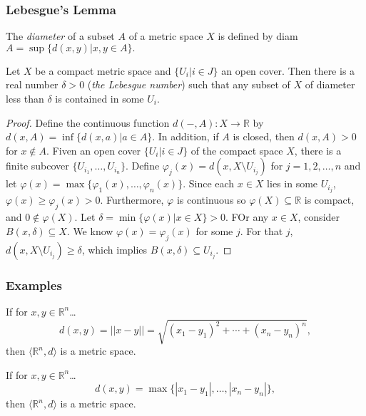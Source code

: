 \subsubsection{Lebesgue's Lemma}

\label{diameter}
The \emph{diameter} of a subset $A$ of a metric space $X$ is defined by diam $A = \sup\{d(x,y) | x,y \in A \}.$

\begin{lemma}
\label{lebesguelemma}
Let $X$ be a compact metric space and $\{ U_i | i \in J \}$ an open cover. Then there is a real number
$\delta > 0$ (\emph{the Lebesgue number}\label{lebesguenumber}) such that any subset of $X$ of diameter less than $\delta$
is contained in some $U_i$.
\end{lemma}

\begin{proof}
Define the continuous function $d(-,A): X \rightarrow \mathbb{R}$ by $d(x, A) = \inf\{d(x,a) | a \in A \}$. In addition,
if $A$ is closed, then $d(x,A) > 0$ for $x \not \in A$. Fiven an open cover $\{ U_i | i \in J \}$ of the compact space $X$,
there is a finite subcover $\{U_{i_1},\dots, U_{i_n} \}$. Define $\varphi_j(x) = d(x,X \setminus U_{i_j})$ for $j = 1,2,\dots, n$
and let $\varphi(x) = \max\{\varphi_1(x), \dots, \varphi_n(x) \}$. Since each $x \in X$ lies in some $U_{i_j}$, $\varphi(x) \geq \varphi_j(x) > 0$.
Furthermore, $\varphi$ is continuous so $\varphi(X) \subseteq \mathbb{R}$ is compact, and $0 \not \in \varphi(X)$. Let $\delta = \min \{ \varphi(x) | x \in X \} > 0$.
FOr any $x \in X$, consider $B(x, \delta) \subseteq X$. We know $\varphi(x) = \varphi_j(x)$ for some $j$. For that $j$, $d(x,X \setminus U_{i_j}) \geq \delta$, which implies
$B(x, \delta) \subseteq U_{i_j}$.
\end{proof}

\subsubsection{Examples}\label{metricexamples}

\label{euclideanmetric}

If for $x,y \in \mathbb{R}^n$\dots
$$d(x,y) = ||x-y|| = \sqrt{(x_1 - y_1)^2 + \cdots + (x_n - y_n)^n},$$
then $\langle \mathbb{R}^n,d \rangle$ is a metric space.

\label{euclideanmetric}

If for $x,y \in \mathbb{R}^n$\dots
$$d(x,y) = \max\{|x_1 - y_1|, \dots, |x_n - y_n|\},$$
then $\langle \mathbb{R}^n,d \rangle$ is a metric space.\newline


